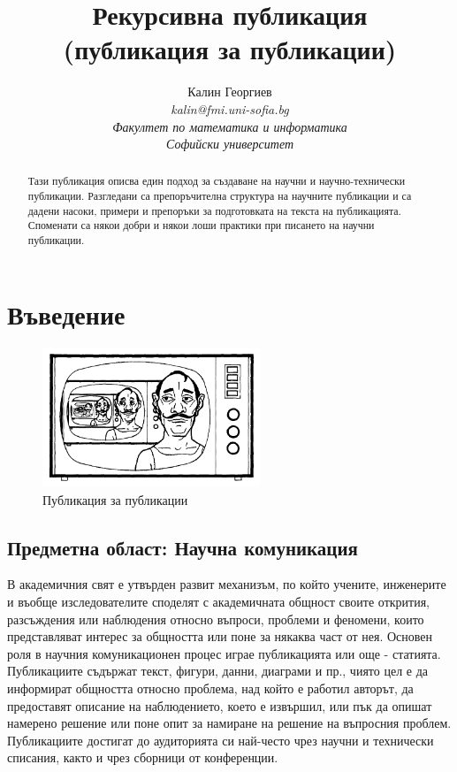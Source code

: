 \documentclass[11pt, oneside]{article}     %
\title{Рекурсивна публикация \\
(публикация за публикации)}
\author{Калин Георгиев\\ 
\textit{kalin@fmi.uni-sofia.bg}\\
\emph{Факултет по математика и информатика}\\\emph{Софийски университет}}
\begin{document}
\maketitle

\begin{abstract}
 Тази публикация описва един подход за създаване на научни и научно-технически публикации. Разгледани са препоръчителна структура на научните публикации и са дадени насоки, примери и препоръки за подготовката на текста на публикацията. Споменати са някои добри и някои лоши практики при писането на научни публикации.
\end{abstract}

\section{Въведение}
\begin{figure}[htbp]
  \centering
  \includegraphics[width=6.5cm]{images/wirth}
  \caption[Да погледнем към себе си \cite{wirth}]
   {Публикация за публикации \cite{wirth}}
  \label{fig:wirth}
\end{figure}


\subsection* {Предметна област: Научна комуникация}

В академичния свят е утвърден развит механизъм, по който учените, инженерите и въобще изследователите споделят с академичната общност своите открития, разсъждения или наблюдения относно въпроси, проблеми и феномени, които представляват интерес за общността или поне за някаква част от нея. Основен роля в научния комуникационен процес играе публикацията или още - статията. Публикациите съдържат текст, фигури, данни, диаграми и пр., чиято цел е да информират общността относно проблема, над който е работил авторът, да предоставят описание на наблюдението, което е извършил, или пък да опишат намерено решение или поне опит за намиране на решение на въпросния проблем. Публикациите достигат до аудиторията си най-често чрез научни и технически списания, както и чрез сборници от конференции.
\end{document}
